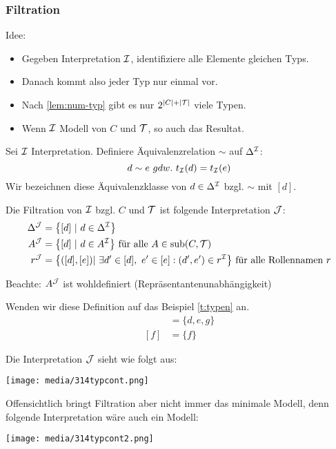 \subsubsection{Filtration}\label{filtration}
Idee:

\begin{itemize}
  \item Gegeben Interpretation $\mathcal{I}$, identifiziere alle Elemente gleichen Typs.
  \item Danach kommt also jeder Typ nur einmal vor.
  \item Nach \autoref{lem:num-typ} gibt es nur $2^{|C|+|\mathcal{T}|}$ viele Typen.
  \item Wenn $\mathcal{I}$ Modell von $C$ und $\mathcal{T}$, so auch das Resultat.
\end{itemize}

\begin{definition}[Filtration]

Sei $\mathcal{I}$ Interpretation. Definiere Äquivalenzrelation $\sim$ auf
$\Delta^{\mathcal{I}}$: $$d \sim e\ gdw.\ t_\MI\left( d \right) = t_\MI\left( e \right)$$
Wir bezeichnen diese Äquivalenzklasse von $d \in \Delta^{\mathcal{I}}$ bzgl. $\sim$ mit $\left\lbrack d \right\rbrack$.

Die Filtration von $\mathcal{I}$ bzgl. $C$ und $\mathcal{T}$ ist folgende Interpretation $\mathcal{J}$:
\begin{align*}
    \Delta^{\MJ} &= \left\{ \left\lbrack d \right\rbrack\ |\ d \in \Delta^\MI \right\}\\
    A^{\MJ} &= \left\{ \left\lbrack d \right\rbrack\ |\ d \in A^\MI \right\}
  \text{ für alle }A \in \sub\left( C,\MT \right)\\
  r^{\MJ} &= \left\{ \left( \left\lbrack d \right\rbrack,\left\lbrack e \right\rbrack \right)|\ \exists d' \in \left\lbrack d \right\rbrack,\ e' \in \left\lbrack e \right\rbrack:\left( d',e' \right) \in r^\MI \right\}
  \text{ für alle Rollennamen } r
\end{align*}

Beachte: $A^{\mathcal{J}}$ ist wohldefiniert (Repräsentantenunabhängigkeit)
\end{definition}

\begin{tafel} [continues=t:typen]
Wenden wir diese Definition auf das Beispiel \autoref{t:typen} an.
\begin{align*}
    [d]&=\{d,e,g\}\\
    [f]&=\{f\}
\end{align*}

Die Interpretation $\mathcal{J}$ sieht wie folgt aus:

\texttt{[image: media/314typcont.png]}

Offensichtlich bringt Filtration aber nicht immer das minimale Modell, denn folgende Interpretation wäre auch ein Modell:

\texttt{[image: media/314typcont2.png]}
\end{tafel}

